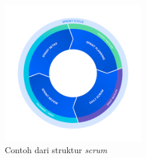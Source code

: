 \documentclass[a4paper]{article}
\begin{document}
\begin{figure}[h]
    \centering
    \includegraphics[width=6cm]{images/sprint_cycle-c.png}
    \caption{Contoh dari struktur \textit{scrum}\autocite{atlassian-agile-scrum}}
\end{figure}
\end{document}
